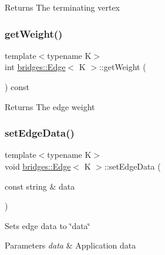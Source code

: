 \begin{DoxyReturn}{Returns}
The terminating vertex 
\end{DoxyReturn}
\hypertarget{classbridges_1_1_edge_a7bd535b15560a29ffbdc16a2c8a7678d}{}\label{classbridges_1_1_edge_a7bd535b15560a29ffbdc16a2c8a7678d} 
\subsubsection{\texorpdfstring{get\+Weight()}{getWeight()}}
{\footnotesize\ttfamily template$<$typename K$>$ \\
int \hyperlink{classbridges_1_1_edge}{bridges\+::\+Edge}$<$ K $>$\+::get\+Weight (\begin{DoxyParamCaption}{ }\end{DoxyParamCaption}) const\hspace{0.3cm}{\ttfamily [inline]}}

\begin{DoxyReturn}{Returns}
The edge weight 
\end{DoxyReturn}
\hypertarget{classbridges_1_1_edge_a4521143efeb4621df1ac9017dbc3461d}{}\label{classbridges_1_1_edge_a4521143efeb4621df1ac9017dbc3461d} 
\subsubsection{\texorpdfstring{set\+Edge\+Data()}{setEdgeData()}}
{\footnotesize\ttfamily template$<$typename K$>$ \\
void \hyperlink{classbridges_1_1_edge}{bridges\+::\+Edge}$<$ K $>$\+::set\+Edge\+Data (\begin{DoxyParamCaption}\item[{const string \&}]{data }\end{DoxyParamCaption})\hspace{0.3cm}{\ttfamily [inline]}}

Sets edge data to \char`\"{}data\char`\"{} 
\begin{DoxyParams}{Parameters}
{\em data} & Application data \\
\hline
\end{DoxyParams}
\hypertarget{classbridges_1_1_edge_ad34446f673287f3291a0c68efd3613e7}{}\label{classbridges_1_1_edge_ad34446f673287f3291a0c68efd3613e7} 
